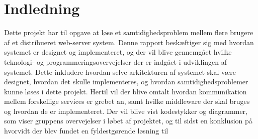 \chapter{Indledning}\label{ch:indledning}
Dette projekt har til opgave at løse et samtidighedsproblem mellem flere brugere af et distribueret web-server system.
Denne rapport beskæftiger sig med hvordan systemet er designet og implementeret, og der vil blive gennemgået hvilke teknologi- og programmeringsovervejelser der er indgået i udviklingen af systemet. Dette inkludere hvordan selve arkitekturen af systemet skal være designet, hvordan det skulle implementeres, og hvordan samtidighedsproblemer kunne løses i dette projekt. Hertil vil der blive omtalt hvordan kommunikation mellem forskellige services er grebet an, samt hvilke middleware der skal bruges og hvordan de er implementeret. Der vil blive vist kodestykker og diagrammer, som viser gruppens overvejelser i løbet af projektet, og til sidst en konklusion på hvorvidt der blev fundet en fyldestgørende løsning til 